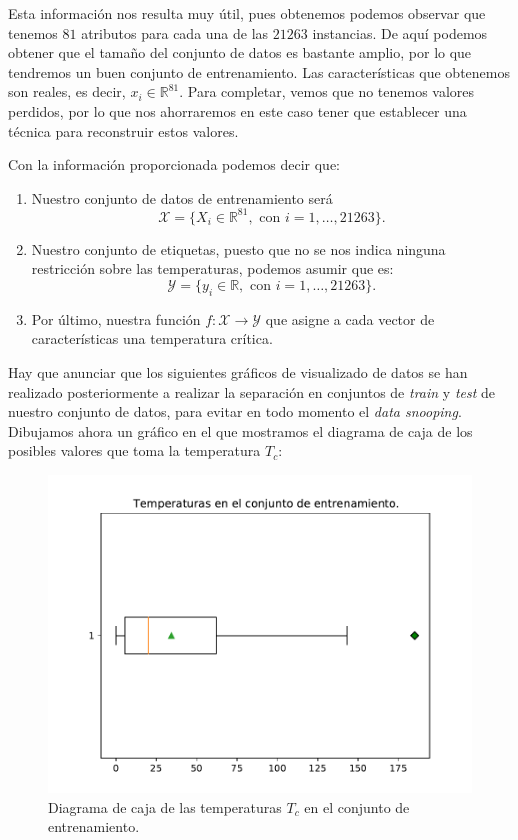 \documentclass[a4paper, 20pt]{article}
\newcommand{\R}{\mathbb R}
\begin{document}
Esta información nos resulta muy útil, pues obtenemos podemos observar que tenemos $81$ atributos para cada una de las $21263$ instancias. De aquí podemos obtener que el tamaño del conjunto de datos es bastante amplio, por lo que tendremos un buen conjunto de entrenamiento. Las características que obtenemos son reales, es decir, $x_i \in \mathbb R^{81}$. Para completar, vemos que no tenemos valores perdidos, por lo que nos ahorraremos en este caso tener que establecer una técnica para reconstruir estos valores.

Con la información proporcionada podemos decir que:

\begin{enumerate}
\item Nuestro conjunto de datos de entrenamiento será
  $$\mathcal X = \{ X_i \in \R^{81}, \text{ con } i = 1, \dots , 21263 \}.$$

\item Nuestro conjunto de etiquetas, puesto que no se nos indica ninguna restricción sobre las temperaturas, podemos asumir que es:
  $$
  \mathcal Y = \{ y_i \in \R, \text { con } i = 1,\dots,21263\}.
  $$

\item Por último, nuestra función $f : \mathcal X \to \mathcal Y$ que asigne a cada vector de características una temperatura crítica.
  
\end{enumerate}

Hay que anunciar que los siguientes gráficos de visualizado de datos se han realizado posteriormente a realizar la separación en conjuntos de \emph{train} y \emph{test} de nuestro conjunto de datos, para evitar en todo momento el \emph{data snooping}.\\

Dibujamos ahora un gráfico en el que mostramos el diagrama de caja de los posibles valores que toma la temperatura $T_c$:

\begin{figure}[H]
  \centering
  \includegraphics[scale = 0.4]{boxplot_y.pdf}
  \caption{Diagrama de caja de las temperaturas $T_c$ en el conjunto de entrenamiento.}
\end{figure}
\end{document}
